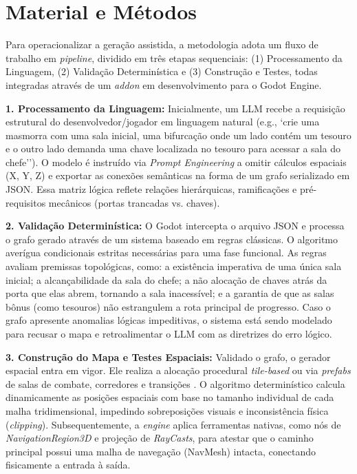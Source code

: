 \documentclass[
  12pt,
  a4paper,
  oneside,
  article,
  brazil
]{abntex2}
\begin{document}
\section{Material e Métodos}

Para operacionalizar a geração assistida, a metodologia adota um fluxo de trabalho em \textit{pipeline}, dividido em três etapas sequenciais: (1) Processamento da Linguagem, (2) Validação Determinística e (3) Construção e Testes, todas integradas através de um \textit{addon} em desenvolvimento para o Godot Engine.

\textbf{1. Processamento da Linguagem:} Inicialmente, um LLM recebe a requisição estrutural do desenvolvedor/jogador em linguagem natural (e.g., `crie uma masmorra com uma sala inicial, uma bifurcação onde um lado contém um tesouro e o outro lado demanda uma chave localizada no tesouro para acessar a sala do chefe''). O modelo é instruído via \textit{Prompt Engineering} a omitir cálculos espaciais (X, Y, Z) e exportar as conexões semânticas na forma de um grafo serializado em JSON. Essa matriz lógica reflete relações hierárquicas, ramificações e pré-requisitos mecânicos (portas trancadas vs. chaves).

\textbf{2. Validação Determinística:} O Godot intercepta o arquivo JSON e processa o grafo gerado através de um sistema baseado em regras clássicas. O algoritmo averígua condicionais estritas necessárias para uma fase funcional. As regras avaliam premissas topológicas, como: a existência imperativa de uma única sala inicial; a alcançabilidade da sala do chefe; a não alocação de chaves atrás da porta que elas abrem, tornando a sala inacessível; e a garantia de que as salas bônus (como tesouros) não estrangulem a rota principal de progresso. Caso o grafo apresente anomalias lógicas impeditivas, o sistema está sendo modelado para recusar o mapa e retroalimentar o LLM com as diretrizes do erro lógico.

\textbf{3. Construção do Mapa e Testes Espaciais:} Validado o grafo, o gerador espacial entra em vigor. Ele realiza a alocação procedural \textit{tile-based} ou via \textit{prefabs} de salas de combate, corredores e transições \cite{xu2025constraint}. O algoritmo determinístico calcula dinamicamente as posições espaciais com base no tamanho individual de cada malha tridimensional, impedindo sobreposições visuais e inconsistência física (\textit{clipping}). Subsequentemente, a \textit{engine} aplica ferramentas nativas, como nós de \textit{NavigationRegion3D} e projeção de \textit{RayCasts}, para atestar que o caminho principal possui uma malha de navegação (NavMesh) intacta, conectando fisicamente a entrada à saída.
\end{document}
